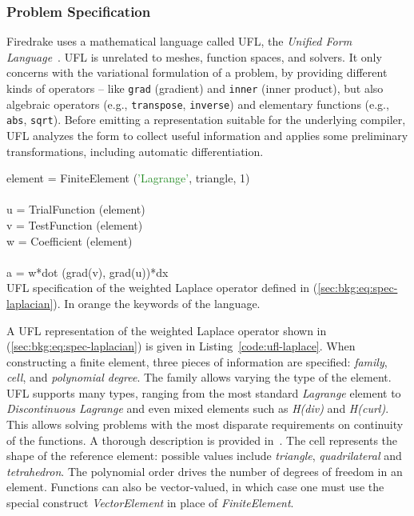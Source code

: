 \subsubsection{Problem Specification}
Firedrake uses a mathematical language called UFL, the {\em Unified Form Language}~\cite{ufl-cite}. UFL is unrelated to meshes, function spaces, and solvers. It only concerns with the variational formulation of a problem, by providing different kinds of operators -- like \texttt{grad} (gradient) and \texttt{inner} (inner product), but also algebraic operators (e.g., \texttt{transpose}, \texttt{inverse}) and elementary functions (e.g., \texttt{abs}, \texttt{sqrt}). Before emitting a representation suitable for the underlying compiler, UFL analyzes the form to collect useful information and applies some preliminary transformations, including automatic differentiation.

\begin{algorithm}[h]
\scriptsize\ttfamily
{}

element = \textcolor{RedOrange}{FiniteElement} (\textcolor{ForestGreen}{'Lagrange'}, \textcolor{RedOrange}{triangle}, 1)\\
~\\
u = \textcolor{RedOrange}{TrialFunction} (element)\\
v = \textcolor{RedOrange}{TestFunction} (element)\\
w = \textcolor{RedOrange}{Coefficient} (element)\\
~\\
a = w*\textcolor{RedOrange}{dot} (\textcolor{RedOrange}{grad}(v), \textcolor{RedOrange}{grad}(u))*\textcolor{RedOrange}{dx}\\

\caption{UFL specification of the weighted Laplace operator defined in (\ref{sec:bkg:eq:spec-laplacian}). In orange the keywords of the language. }
\label{code:ufl-laplace}
\end{algorithm}

A UFL representation of the weighted Laplace operator shown in (\ref{sec:bkg:eq:spec-laplacian}) is given in Listing~\ref{code:ufl-laplace}. When constructing a finite element, three pieces of information are specified: {\em family}, {\em cell}, and {\em polynomial degree}. The family allows varying the type of the element. UFL supports many types, ranging from the most standard {\em Lagrange} element to {\em Discontinuous Lagrange} and even mixed elements such as {\em H(div)} and {\em H(curl)}. This allows solving problems with the most disparate requirements on continuity of the functions. A thorough description is provided in~\cite{fenics-book}. The cell represents the shape of the reference element: possible values include {\em triangle}, {\em quadrilateral} and {\em tetrahedron}. The polynomial order drives the number of degrees of freedom in an element. Functions can also be vector-valued, in which case one must use the special construct {\em VectorElement} in place of {\em FiniteElement}. 

